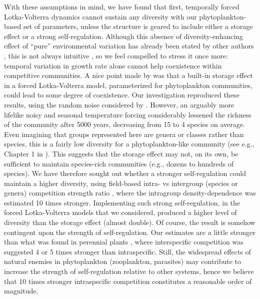 \documentclass[smallcondensed,referee]{svjour3}       %
\begin{document}
With these assumptions in mind, we have found that first, temporally
forced Lotka-Volterra dynamics cannot sustain any diversity with our
phytoplankton-based set of parameters, unless the structure is geared
to include either a storage effect or a strong self-regulation. Although
this absence of diversity-enhancing effect of ``pure'' environmental
variation has already been stated by other authors \citep{chesson_roles_1997,barabas_community_2012,fox_intermediate_2013,scranton_coexistence_2016},
this is not always intuitive \citep{fox_intermediate_2013}, so we
feel compelled to stress it once more: temporal variation in growth
rate alone cannot help coexistence within competitive communities.
A nice point made by \citet{scranton_coexistence_2016} was that a
built-in storage effect in a forced Lotka-Volterra model, parameterized
for phytoplankton communities, could lead to some degree of coexistence.
Our investigation reproduced these results, using the random noise
considered by \citet{scranton_coexistence_2016}. However, an arguably
more lifelike noisy and seasonal temperature forcing considerably
lessened the richness of the community after 5000 years, decreasing
from 15 to 4 species on average. Even imagining that groups represented
here are genera or classes rather than species, this is a fairly low
diversity for a phytoplankton-like community (see e.g., Chapter 1
in \citealp{reynolds2006ecology}). This suggests that the storage
effect may not, on its own, be sufficient to maintain species-rich
communities (e.g., dozens to hundreds of species). We have therefore
sought out whether a stronger self-regulation could maintain a higher
diversity, using field-based intra- vs intergroup (species or genera)
competition strength ratio \citep{barraquand2018coastal}, where the
intragroup density-dependence was estimated 10 times stronger. Implementing
such strong self-regulation, in the forced Lotka-Volterra models that
we considered, produced a higher level of diversity than the storage
effect (almost double). Of course, the result is somehow contingent
upon the strength of self-regulation. Our estimates are a little stronger
than what was found in perennial plants \citep{adler_coexistence_2010},
where interspecific competition was suggested 4 or 5 times stronger
than intraspecific. Still, the widespread effects of natural enemies
in phytoplankton (zooplankton, parasites) may contribute to increase
the strength of self-regulation \citep{barraquand2018coastal,chesson_updates_2018}
relative to other systems, hence we believe that 10 times stronger
intraspecific competition constitutes a reasonable order of magnitude. 
\end{document}
